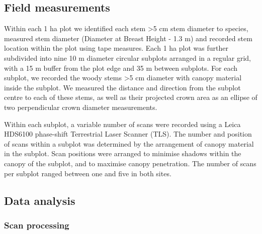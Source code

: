 \documentclass[11pt,a4paper]{article}
\begin{document}
\subsection{Field measurements}

Within each 1 ha plot we identified each stem >5 cm stem diameter to species, measured stem diameter (Diameter at Breast Height - 1.3 m) and recorded stem location within the plot using tape measures. Each 1 ha plot was further subdivided into nine 10 m diameter circular subplots arranged in a regular grid, with a 15 m buffer from the plot edge and 35 m between subplots. For each subplot, we recorded the woody stems >5 cm diameter with canopy material inside the subplot. We measured the distance and direction from the subplot centre to each of these stems, as well as their projected crown area as an ellipse of two perpendicular crown diameter measurements.

Within each subplot, a variable number of scans were recorded using a Leica HDS6100 phase-shift Terrestrial Laser Scanner (TLS). The number and position of scans within a subplot was determined by the arrangement of canopy material in the subplot. Scan positions were arranged to minimise shadows within the canopy of the subplot, and to maximise canopy penetration. The number of scans per subplot ranged between one and five in both sites. 

\subsection{Data analysis}

\subsubsection{Scan processing}
\end{document}
